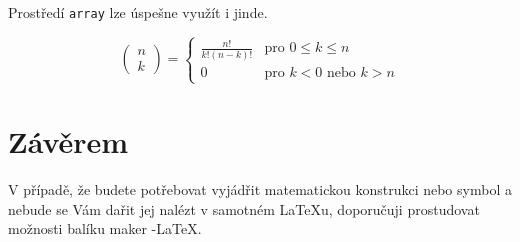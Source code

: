 \documentclass [11pt, a4paper]{article}
\begin{document}
\begin{twocolumn}
Prostředí \texttt{array} lze úspešne využít i jinde.

$$
\begin{pmatrix}
n \\
k
\end{pmatrix}=\left\{
\begin{array}{ll}
\frac{n!}{k!(n-k)!} & \text{pro } 0\leq k\leq n \\
0 & \text{pro } k < 0 \text{ nebo } k > n
\end{array} \right. $$

\section{Závěrem}
V případě, že budete potřebovat vyjádřit matematickou
konstrukci nebo symbol a nebude se Vám dařit jej nalézt
v samotném \LaTeX u, doporučuji prostudovat možnosti balíku maker \AmS-\LaTeX.
\end{twocolumn}
\end{document}
